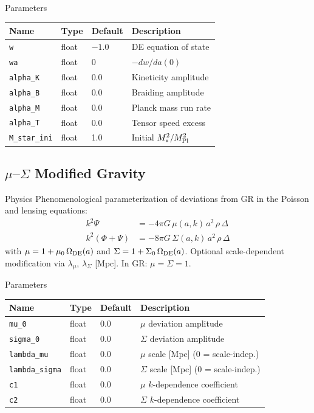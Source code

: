 \documentclass[11pt,a4paper]{article}
\begin{document}
\begin{parambox}{Parameters}
\begin{tabular}{llll}
\toprule
Name & Type & Default & Description \\
\midrule
\texttt{w} & float & $-1.0$ & DE equation of state \\
\texttt{wa} & float & 0 & $-dw/da(0)$ \\
\texttt{alpha\_K} & float & 0.0 & Kineticity amplitude \\
\texttt{alpha\_B} & float & 0.0 & Braiding amplitude \\
\texttt{alpha\_M} & float & 0.0 & Planck mass run rate \\
\texttt{alpha\_T} & float & 0.0 & Tensor speed excess \\
\texttt{M\_star\_ini} & float & 1.0 & Initial $M_*^2/M_{\rm Pl}^2$ \\
\bottomrule
\end{tabular}
\end{parambox}

\newpage
\subsection{$\mu$--$\Sigma$ Modified Gravity}

\begin{physbox}{Physics}
Phenomenological parameterization of deviations from GR in the Poisson and lensing equations:
\begin{align}
    k^2\Psi &= -4\pi G\, \mu(a,k)\, a^2\, \rho\,\Delta \\
    k^2(\Phi+\Psi) &= -8\pi G\, \Sigma(a,k)\, a^2\, \rho\,\Delta
\end{align}
with $\mu = 1 + \mu_0\,\Omega_{\rm DE}(a)$ and $\Sigma = 1 + \Sigma_0\,\Omega_{\rm DE}(a)$. Optional scale-dependent modification via $\lambda_\mu$, $\lambda_\Sigma$ [Mpc].
In GR: $\mu = \Sigma = 1$.
\end{physbox}

\begin{parambox}{Parameters}
\begin{tabular}{llll}
\toprule
Name & Type & Default & Description \\
\midrule
\texttt{mu\_0} & float & 0.0 & $\mu$ deviation amplitude \\
\texttt{sigma\_0} & float & 0.0 & $\Sigma$ deviation amplitude \\
\texttt{lambda\_mu} & float & 0.0 & $\mu$ scale [Mpc] (0 = scale-indep.) \\
\texttt{lambda\_sigma} & float & 0.0 & $\Sigma$ scale [Mpc] (0 = scale-indep.) \\
\texttt{c1} & float & 0.0 & $\mu$ $k$-dependence coefficient \\
\texttt{c2} & float & 0.0 & $\Sigma$ $k$-dependence coefficient \\
\bottomrule
\end{tabular}
\end{parambox}
\end{document}
